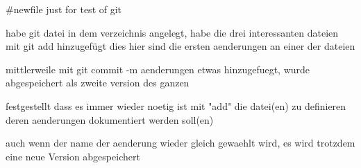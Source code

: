 #newfile just for test of git

habe git datei in dem verzeichnis angelegt,
habe die drei interessanten dateien mit git add hinzugefügt
dies hier sind die ersten aenderungen an einer der dateien

mittlerweile mit git commit -m aenderungen etwas hinzugefuegt, 
wurde abgespeichert als zweite version des ganzen

festgestellt dass es immer wieder noetig ist mit "add"
die datei(en) zu definieren deren aenderungen dokumentiert werden soll(en)

auch wenn der name der aenderung wieder gleich gewaehlt wird,
es wird trotzdem eine neue Version abgespeichert